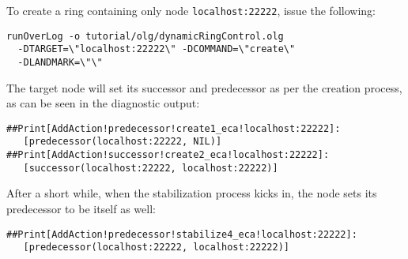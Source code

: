 \documentclass{article}
\begin{document}
To create a ring containing only node 
\lstinline$localhost:22222$, issue the following:
\begin{verbatim}
runOverLog -o tutorial/olg/dynamicRingControl.olg
  -DTARGET=\"localhost:22222\" -DCOMMAND=\"create\"
  -DLANDMARK=\"\"
\end{verbatim}
The target node will set its successor and predecessor as per the
creation process, as can be seen in the diagnostic output:
\begin{verbatim}
##Print[AddAction!predecessor!create1_eca!localhost:22222]:
   [predecessor(localhost:22222, NIL)]
##Print[AddAction!successor!create2_eca!localhost:22222]:
   [successor(localhost:22222, localhost:22222)]
\end{verbatim}
After a short while, when the stabilization process kicks in, the node
sets its predecessor to be itself as well:
\begin{verbatim}
##Print[AddAction!predecessor!stabilize4_eca!localhost:22222]:
   [predecessor(localhost:22222, localhost:22222)]
\end{verbatim}
\end{document}

